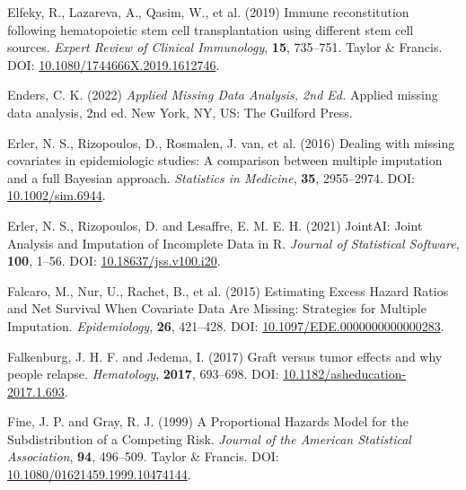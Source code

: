 \documentclass[
  letterpaper,
  DIV=11,
  numbers=noendperiod]{scrreprt}
\newlength{\cslhangindent}
\newenvironment{CSLReferences}[2] %
 {\begin{list}{}{%
  \setlength{\itemindent}{0pt}
  \setlength{\leftmargin}{0pt}
  \setlength{\parsep}{0pt}
  \ifodd #1
   \setlength{\leftmargin}{\cslhangindent}
   \setlength{\itemindent}{-1\cslhangindent}
  \fi
  \setlength{\itemsep}{#2\baselineskip}}}
 {\end{list}}
\begin{document}
\begin{CSLReferences}{1}{1}
Elfeky, R., Lazareva, A., Qasim, W., et al. (2019) Immune reconstitution
following hematopoietic stem cell transplantation using different stem
cell sources. \emph{Expert Review of Clinical Immunology}, \textbf{15},
735--751. Taylor \& Francis. DOI:
\href{https://doi.org/10.1080/1744666X.2019.1612746}{10.1080/1744666X.2019.1612746}.

Enders, C. K. (2022) \emph{Applied Missing Data Analysis, 2nd Ed.}
Applied missing data analysis, 2nd ed. New York, NY, US: The Guilford
Press.

Erler, N. S., Rizopoulos, D., Rosmalen, J. van, et al. (2016) Dealing
with missing covariates in epidemiologic studies: A comparison between
multiple imputation and a full {Bayesian} approach. \emph{Statistics in
Medicine}, \textbf{35}, 2955--2974. DOI:
\href{https://doi.org/10.1002/sim.6944}{10.1002/sim.6944}.

Erler, N. S., Rizopoulos, D. and Lesaffre, E. M. E. H. (2021) {JointAI}:
{Joint Analysis} and {Imputation} of {Incomplete Data} in {R}.
\emph{Journal of Statistical Software}, \textbf{100}, 1--56. DOI:
\href{https://doi.org/10.18637/jss.v100.i20}{10.18637/jss.v100.i20}.

Falcaro, M., Nur, U., Rachet, B., et al. (2015) Estimating {Excess
Hazard Ratios} and {Net Survival When Covariate Data Are Missing}:
{Strategies} for {Multiple Imputation}. \emph{Epidemiology},
\textbf{26}, 421--428. DOI:
\href{https://doi.org/10.1097/EDE.0000000000000283}{10.1097/EDE.0000000000000283}.

Falkenburg, J. H. F. and Jedema, I. (2017) Graft versus tumor effects
and why people relapse. \emph{Hematology}, \textbf{2017}, 693--698. DOI:
\href{https://doi.org/10.1182/asheducation-2017.1.693}{10.1182/asheducation-2017.1.693}.

Fine, J. P. and Gray, R. J. (1999) A {Proportional Hazards Model} for
the {Subdistribution} of a {Competing Risk}. \emph{Journal of the
American Statistical Association}, \textbf{94}, 496--509. Taylor \&
Francis. DOI:
\href{https://doi.org/10.1080/01621459.1999.10474144}{10.1080/01621459.1999.10474144}.


\end{CSLReferences}
\end{document}
